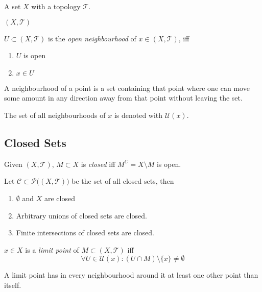 \begin{definition}
   A set \(X\) with a topology \(\mathcal{T}\).
\end{definition}
\begin{remark}[Notation]
   \((X, \mathcal{T})\)
\end{remark}

\begin{definition}
   \(U \subset (X, \mathcal{T})\) is the \emph{open neighbourhood} of \(x \in (X, \mathcal{T})\), iff
   \begin{enumerate}[label=\roman*, align=Center]
      \item \(U\) is open
      \item \(x \in U\)
   \end{enumerate}
\end{definition}
\begin{remark}[Intuition]
   A neighbourhood of a point is a set containing that point where one can move some amount in any direction away from that point without leaving the set.
\end{remark}
\begin{remark}[Notation]
   The set of all neighbourhoods of \(x\) is denoted with \(\mathcal{U}(x)\).
\end{remark}

\subsection{Closed Sets}
\begin{definition}
   Given \((X, \mathcal{T})\), \(M \subset X\) is \emph{closed} iff \(M^C = X \setminus M\) is open.
\end{definition}

\begin{theorem}\label{thm:closed_sets}
   Let \(\mathcal{C} \subset \mathcal{P}\big((X, \mathcal{T})\big)\) be the set of all closed sets, then
   \begin{enumerate}[label=\roman*, align=Center]
      \item \(\emptyset\) and \(X\) are closed
      \item Arbitrary unions of closed sets are closed.
      \item Finite intersections of closed sets are closed.
   \end{enumerate}
\end{theorem}

\begin{definition}
   \(x \in X\) is a \emph{limit point} of \(M \subset (X, \mathcal{T})\) iff
   \[\forall U \in \mathcal{U}(x): (U \cap M) \setminus \{x\} \neq \emptyset\]
\end{definition}
\begin{remark}[Intuition]
   A limit point has in every neighbourhood around it at least one other point than itself.
\end{remark}

